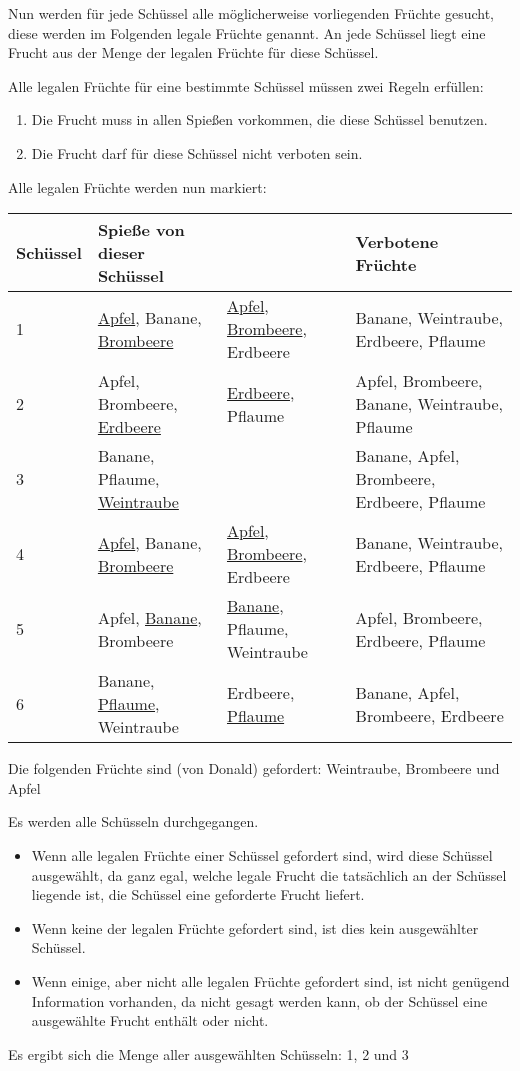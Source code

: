\documentclass[a4paper,10pt,ngerman]{scrartcl}
\begin{document}
Nun werden für jede Schüssel alle möglicherweise vorliegenden Früchte gesucht, diese werden im Folgenden legale Früchte genannt.
An jede Schüssel liegt eine Frucht aus der Menge der legalen Früchte für diese Schüssel.

Alle legalen Früchte für eine bestimmte Schüssel müssen zwei Regeln erfüllen:
\begin{enumerate}
    \item Die Frucht muss in allen Spießen vorkommen, die diese Schüssel benutzen.
    \item Die Frucht darf für diese Schüssel nicht verboten sein.
\end{enumerate}
Alle legalen Früchte werden nun markiert:

\begin{center}
\begin{tabularx}{\linewidth}{l|X|X|X}
    \textbf{Schüssel} & \textbf{Spieße von dieser Schüssel} & & \textbf{Verbotene Früchte} \\
    \hline
    1 & \underline{Apfel}, Banane, \underline{Brombeere} & \underline{Apfel}, \underline{Brombeere}, Erdbeere & Banane, Weintraube, Erdbeere, Pflaume \\
    \hline
    2 & Apfel, Brombeere, \underline{Erdbeere} & \underline{Erdbeere}, Pflaume & Apfel, Brombeere, Banane, Weintraube, Pflaume \\
    \hline
    3 & Banane, Pflaume, \underline{Weintraube} & & Banane, Apfel, Brombeere, Erdbeere, Pflaume \\
    \hline
    4 & \underline{Apfel}, Banane, \underline{Brombeere} & \underline{Apfel}, \underline{Brombeere}, Erdbeere & Banane, Weintraube, Erdbeere, Pflaume \\
    \hline
    5 & Apfel, \underline{Banane}, Brombeere & \underline{Banane}, Pflaume, Weintraube & Apfel, Brombeere, Erdbeere, Pflaume \\
    \hline
    6 & Banane, \underline{Pflaume}, Weintraube & Erdbeere, \underline{Pflaume} & Banane, Apfel, Brombeere, Erdbeere
\end{tabularx}
\end{center}

Die folgenden Früchte sind (von Donald) gefordert: Weintraube, Brombeere und Apfel

Es werden alle Schüsseln durchgegangen.
\begin{itemize}
    \item Wenn alle legalen Früchte einer Schüssel gefordert sind, wird diese Schüssel ausgewählt, da ganz egal, welche legale Frucht die tatsächlich an der Schüssel liegende ist, die Schüssel eine geforderte Frucht liefert.
    \item Wenn keine der legalen Früchte gefordert sind, ist dies kein ausgewählter Schüssel.
    \item Wenn einige, aber nicht alle legalen Früchte gefordert sind, ist nicht genügend Information vorhanden, da nicht gesagt werden kann, ob der Schüssel eine ausgewählte Frucht enthält oder nicht.
\end{itemize}
Es ergibt sich die Menge aller ausgewählten Schüsseln: 1, 2 und 3
\end{document}
